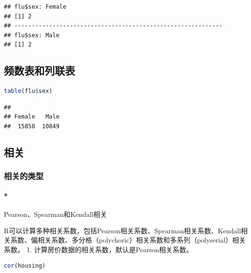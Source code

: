 \documentclass[]{ctexbook}
\let\oldparagraph\paragraph
\renewcommand{\paragraph}[1]{\oldparagraph{#1}\mbox{}}
\begin{document}
\begin{lstlisting}
## flu$sex: Female
## [1] 2
## ------------------------------------------------------------ 
## flu$sex: Male
## [1] 2
\end{lstlisting}

\hypertarget{ux9891ux6570ux8868ux548cux5217ux8054ux8868}{%
\subsection{频数表和列联表}\label{ux9891ux6570ux8868ux548cux5217ux8054ux8868}}

\begin{lstlisting}[language=R]
table(flu$sex)
\end{lstlisting}

\begin{lstlisting}
## 
## Female   Male 
##  15858  10849
\end{lstlisting}

\hypertarget{ux76f8ux5173}{%
\subsection{相关}\label{ux76f8ux5173}}

\hypertarget{ux76f8ux5173ux7684ux7c7bux578b}{%
\subsubsection{相关的类型}\label{ux76f8ux5173ux7684ux7c7bux578b}}

\hypertarget{pearsonspearmanux548ckendallux76f8ux5173}{%
\paragraph*{Pearson、Spearman和Kendall相关}\label{pearsonspearmanux548ckendallux76f8ux5173}}

R可以计算多种相关系数，包括Pearson相关系数、Spearman相关系数、Kendall相关系数、偏相关系数、多分格（polychoric）相关系数和多系列（polyserial）相关系数。
1. 计算房价数据的相关系数，默认是Pearson相关系数。

\begin{lstlisting}[language=R]
cor(housing)
\end{lstlisting}
\end{document}
